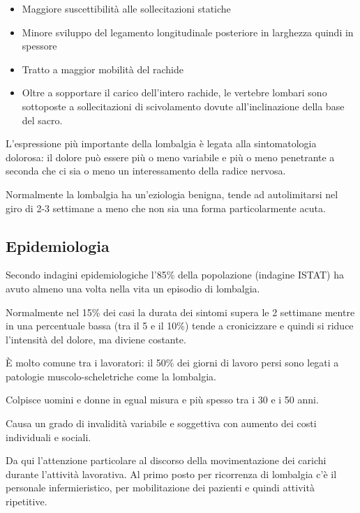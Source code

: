 \begin{itemize}
\item
  Maggiore suscettibilità alle sollecitazioni statiche

\item   
  Minore sviluppo del legamento longitudinale posteriore in larghezza
  quindi in spessore

\item
   
  Tratto a maggior mobilità del rachide

\item
   
  Oltre a sopportare il carico dell'intero rachide, le vertebre lombari
  sono sottoposte a sollecitazioni di scivolamento dovute
  all'inclinazione della base del sacro.
   
\end{itemize}

L'espressione più importante della lombalgia è legata alla
sintomatologia dolorosa: il dolore può essere più o meno variabile e più
o meno penetrante a seconda che ci sia o meno un interessamento della
radice nervosa.

Normalmente la lombalgia ha un'eziologia benigna, tende ad autolimitarsi
nel giro di 2-3 settimane a meno che non sia una forma particolarmente
acuta.

\subsection{Epidemiologia}


Secondo indagini epidemiologiche l'85\% della popolazione (indagine
ISTAT) ha avuto almeno una volta nella vita un episodio di lombalgia.

Normalmente nel 15\% dei casi la durata dei sintomi supera le 2
settimane mentre in una percentuale bassa (tra il 5 e il 10\%) tende a
cronicizzare e quindi si riduce l'intensità del dolore, ma diviene
costante.

È molto comune tra i lavoratori: il 50\% dei giorni di lavoro persi sono
legati a patologie muscolo-scheletriche come la lombalgia.

Colpisce uomini e donne in egual misura e più spesso tra i 30 e i 50
anni.

Causa un grado di invalidità variabile e soggettiva con aumento dei
costi individuali e sociali.

Da qui l'attenzione particolare al discorso della movimentazione dei
carichi durante l'attività lavorativa. Al primo posto per ricorrenza di
lombalgia c'è il personale infermieristico, per mobilitazione dei
pazienti e quindi attività ripetitive.

